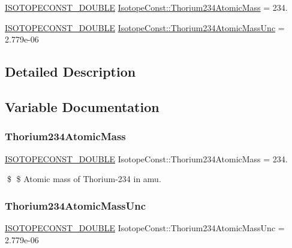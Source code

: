 \begin{DoxyCompactItemize}
\item 
\mbox{\hyperlink{group___isotope_const-_macros_ga8f45a7272ce02c0b4c65c44636ed719a}{I\+S\+O\+T\+O\+P\+E\+C\+O\+N\+S\+T\+\_\+\+D\+O\+U\+B\+LE}} \mbox{\hyperlink{group___isotope_const-_thorium-_th234_ga57c604265dc0092d4939b29235b5b7ca}{Isotope\+Const\+::\+Thorium234\+Atomic\+Mass}} = 234.
\item 
\mbox{\hyperlink{group___isotope_const-_macros_ga8f45a7272ce02c0b4c65c44636ed719a}{I\+S\+O\+T\+O\+P\+E\+C\+O\+N\+S\+T\+\_\+\+D\+O\+U\+B\+LE}} \mbox{\hyperlink{group___isotope_const-_thorium-_th234_gaae613e7230d790178aea2f926cff06ac}{Isotope\+Const\+::\+Thorium234\+Atomic\+Mass\+Unc}} = 2.\+779e-\/06
\end{DoxyCompactItemize}


\subsection{Detailed Description}


\subsection{Variable Documentation}
\mbox{\label{group___isotope_const-_thorium-_th234_ga57c604265dc0092d4939b29235b5b7ca}} 
\subsubsection{\texorpdfstring{Thorium234\+Atomic\+Mass}{Thorium234AtomicMass}}
{\footnotesize\ttfamily \mbox{\hyperlink{group___isotope_const-_macros_ga8f45a7272ce02c0b4c65c44636ed719a}{I\+S\+O\+T\+O\+P\+E\+C\+O\+N\+S\+T\+\_\+\+D\+O\+U\+B\+LE}} Isotope\+Const\+::\+Thorium234\+Atomic\+Mass = 234.}

\$ \$ Atomic mass of Thorium-\/234 in amu. \mbox{\label{group___isotope_const-_thorium-_th234_gaae613e7230d790178aea2f926cff06ac}} 
\subsubsection{\texorpdfstring{Thorium234\+Atomic\+Mass\+Unc}{Thorium234AtomicMassUnc}}
{\footnotesize\ttfamily \mbox{\hyperlink{group___isotope_const-_macros_ga8f45a7272ce02c0b4c65c44636ed719a}{I\+S\+O\+T\+O\+P\+E\+C\+O\+N\+S\+T\+\_\+\+D\+O\+U\+B\+LE}} Isotope\+Const\+::\+Thorium234\+Atomic\+Mass\+Unc = 2.\+779e-\/06}

